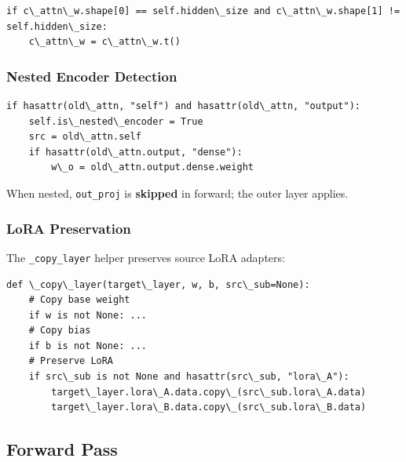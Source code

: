 \begin{lstlisting}
if c\_attn\_w.shape[0] == self.hidden\_size and c\_attn\_w.shape[1] != self.hidden\_size:
    c\_attn\_w = c\_attn\_w.t()
\end{lstlisting}

\subsubsection{Nested Encoder Detection}

\begin{lstlisting}
if hasattr(old\_attn, "self") and hasattr(old\_attn, "output"):
    self.is\_nested\_encoder = True
    src = old\_attn.self
    if hasattr(old\_attn.output, "dense"):
        w\_o = old\_attn.output.dense.weight
\end{lstlisting}

When nested, \texttt{out\_proj} is \textbf{skipped} in forward; the outer layer applies.

\subsubsection{LoRA Preservation}

The \texttt{\_copy\_layer} helper preserves source LoRA adapters:

\begin{lstlisting}
def \_copy\_layer(target\_layer, w, b, src\_sub=None):
    # Copy base weight
    if w is not None: ...
    # Copy bias
    if b is not None: ...
    # Preserve LoRA
    if src\_sub is not None and hasattr(src\_sub, "lora\_A"):
        target\_layer.lora\_A.data.copy\_(src\_sub.lora\_A.data)
        target\_layer.lora\_B.data.copy\_(src\_sub.lora\_B.data)
\end{lstlisting}

\subsection{Forward Pass}

